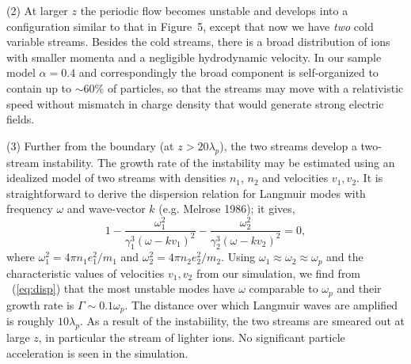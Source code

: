 \noindent
(2) At larger $z$ the periodic flow becomes unstable and develops into a
configuration similar to that in Figure~5, except that now we have {\it two}
cold variable streams. Besides the cold streams, there is a broad distribution
of ions with smaller momenta and a negligible hydrodynamic velocity.
In our sample model $\alpha=0.4$ and
correspondingly the broad component is self-organized to contain up to
$\sim 60\%$ of particles, so that the streams may move with a relativistic speed
without mismatch in charge density that would generate strong electric fields.

\noindent
(3) Further from the boundary (at $z>20\lambda_p$), the two streams
develop a two-stream instability. The growth rate of the instability may be
estimated using an idealized model of two streams with densities $n_1$,
$n_2$ and velocities $v_1,v_2$. It is straightforward to derive the dispersion
relation for Langmuir modes with frequency $\omega$ and wave-vector $k$
(e.g. Melrose 1986); it gives,
\begin{equation}
\label{eq:disp}
    1-\frac{\omega_1^{2}}{\gamma_1^3(\omega - kv_1)^2} - \frac{\omega_2^{2}}{\gamma_2^3(\omega - kv_2)^2} = 0,
\end{equation}
where $\omega_1^2=4\pi n_1 e_1^2/m_1$ and $\omega_2^2=4\pi n_2 e_2^2/m_2$.
Using $\omega_1\approx\omega_2\approx\omega_p$ and the characteristic values
of velocities $v_1,v_2$ from our simulation, we find from \Eq~(\ref{eq:disp}) that
the most unstable modes have $\omega$ comparable to $\omega_p$ and their
growth rate is $\Gamma\sim 0.1\omega_p$.
The distance over which Langmuir waves are amplified is roughly
 $10\lambda_p$.
As a result of the instabiility, the two streams are smeared out at large $z$,
in particular the stream of lighter ions.
No significant particle acceleration is seen in the simulation.

